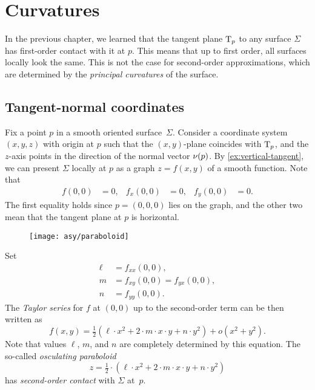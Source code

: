 \chapter{Curvatures}
\label{chap:surface-curvature}

In the previous chapter, we learned that the tangent plane $\mathrm{T}_p$ to any surface $\Sigma$ has first-order contact with it at $p$.
This means that up to first order, all surfaces locally look the same.
This is not the case for second-order approximations, which are determined by the {}\emph{principal curvatures} of the surface.

\section{Tangent-normal coordinates} \label{sec:lmn}

Fix a point $p$ in a smooth oriented surface~$\Sigma$.
Consider a coordinate system $(x,y,z)$ with origin at $p$ such that the $(x,y)$-plane coincides with $\mathrm{T}_p$, and the $z$-axis points in the direction of the normal vector $\nu(p)$.
By \ref{ex:vertical-tangent}, we can present $\Sigma$ locally at $p$ as a graph $z=f(x,y)$ of a smooth function. 
Note that 
\begin{align*}
f(0,0)&=0,
&
f_x(0,0)&=0,
&
f_y(0,0)&=0.
\end{align*}
The first equality holds since $p=(0,0,0)$ lies on the graph, and the other two mean that the tangent plane at $p$ is horizontal.


\begin{wrapfigure}[7]{o}{42 mm}
\vskip-4mm
\centering
\texttt{[image: asy/paraboloid]}
\vskip-3mm
\end{wrapfigure}

Set 
\begin{align*}
\ell&=f_{xx}(0,0),
\\
m&=f_{xy}(0,0)=f_{yx}(0,0),
\\
n&=f_{yy}(0,0).
\end{align*}
The {}\emph{Taylor series} 
for $f$ at $(0,0)$ up to the second-order term can be then written as
\[f(x,y)=\tfrac12(\ell\cdot x^2+2\cdot m\cdot x\cdot y+n\cdot y^2)+o(x^2+y^2).\]
Note that values $\ell$, $m$, and $n$ are completely determined by this equation.
The so-called \emph{osculating paraboloid}
\[z=\tfrac12\cdot(\ell\cdot x^2+2\cdot m\cdot x\cdot y+n\cdot y^2)\]
has \emph{second-order contact} with $\Sigma$ at~$p$.

